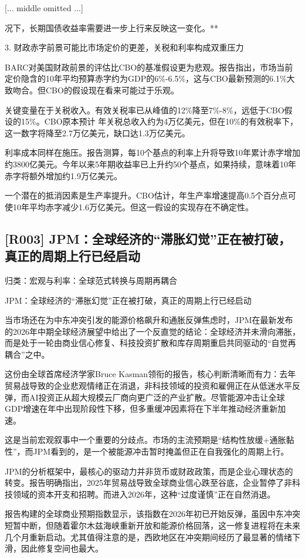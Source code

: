 \documentclass[11pt]{ctexart}
\begin{document}
[... middle omitted ...]

况下，长期国债收益率需要进一步上行来反映这一变化。**

3. 财政赤字前景可能比市场定价的更差，关税和利率构成双重压力

BARC对美国财政前景的评估比CBO的基准假设更为悲观。报告指出，市场当前定价隐含的10年平均预算赤字约为GDP的6\%-6.5\%，这与CBO最新预测的6.1\%大致吻合。但CBO的假设现在看来可能过于乐观。

关键变量在于关税收入。有效关税率已从峰值的12\%降至7\%-8\%，远低于CBO假设的15\%。CBO原本预计 年关税总收入约为4万亿美元，但在10\%的有效税率下，这一数字将降至2.7万亿美元，缺口达1.3万亿美元。

利率成本同样在施压。报告测算，每10个基点的利率上升将导致10年累计赤字增加约3800亿美元。今年以来5年期收益率已上升约50个基点，如果持续，意味着10年赤字将额外增加约1.9万亿美元。

一个潜在的抵消因素是生产率提升。CBO估计，年生产率增速提高0.5个百分点可使10年平均赤字减少1.6万亿美元。但这一假设的实现存在不确定性。

\subsection{[R003] JPM：全球经济的“滞胀幻觉”正在被打破，真正的周期上行已经启动}
{\small\color{refgray}归类：宏观与利率：全球范式转换与周期再耦合}

JPM：全球经济的“滞胀幻觉”正在被打破，真正的周期上行已经启动

当市场还在为中东冲突引发的能源价格飙升和通胀反弹焦虑时，JPM在最新发布的2026年中期全球经济展望中给出了一个反直觉的结论：全球经济并未滑向滞胀，而是处于一轮由商业信心修复、科技投资扩散和库存周期重启共同驱动的“自觉再耦合”之中。

这份由全球首席经济学家Bruce Kasman领衔的报告，核心判断清晰而有力：去年贸易战导致的企业悲观情绪正在消退，非科技领域的投资和雇佣正在从低迷水平反弹，而AI投资正从超大规模云厂商向更广泛的产业扩散。尽管能源冲击让全球GDP增速在年中出现阶段性下移，但多重缓冲因素将在下半年推动经济重新加速。

这是当前宏观叙事中一个重要的分歧点。市场的主流预期是“结构性放缓+通胀黏性”，而JPM看到的，是一个被能源冲击暂时掩盖但正在自我强化的周期上行。

JPM的分析框架中，最核心的驱动力并非货币或财政政策，而是企业心理状态的转变。报告明确指出，2025年贸易战导致全球商业信心跌至谷底，企业暂停了非科技领域的资本开支和招聘。而进入2026年，这种“过度谨慎”正在自然消退。

报告构建的全球商业预期指数显示，该指数在2026年初已开始反弹，虽因中东冲突短暂中断，但随着霍尔木兹海峡重新开放和能源价格回落，这一修复进程将在未来几个月重新启动。尤其值得注意的是，西欧地区在冲突期间经历了最显著的情绪下滑，因此修复空间也最大。
\end{document}
